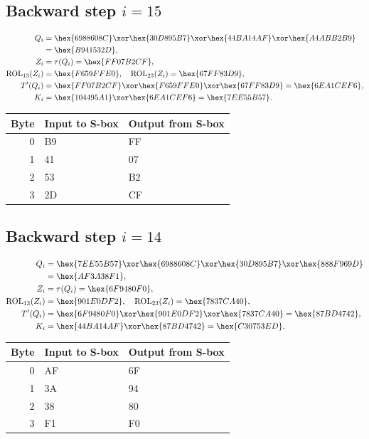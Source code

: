 \subsection*{Backward step $i=15$}
\begin{align*}
Q_i&=\hex{6988608C}\xor\hex{30D895B7}\xor\hex{44BA14AF}\xor\hex{A4ABB2B9}\\&=\hex{B941532D},\\
Z_i&=\tau(Q_i)=\hex{FF07B2CF},\\
\operatorname{ROL}_{13}(Z_i)&=\hex{F659FFE0},\quad\operatorname{ROL}_{23}(Z_i)=\hex{67FF83D9},\\
T'(Q_i)&=\hex{FF07B2CF}\xor\hex{F659FFE0}\xor\hex{67FF83D9}=\hex{6EA1CEF6},\\
K_i&=\hex{104495A1}\xor\hex{6EA1CEF6}=\hex{7EE55B57}.\end{align*}
\begingroup\small
\begin{longtable}{rll}
\toprule
Byte & Input to S-box & Output from S-box\\\midrule
\endhead
0 & B9 & FF\\
1 & 41 & 07\\
2 & 53 & B2\\
3 & 2D & CF\\
\bottomrule\end{longtable}
\endgroup
\subsection*{Backward step $i=14$}
\begin{align*}
Q_i&=\hex{7EE55B57}\xor\hex{6988608C}\xor\hex{30D895B7}\xor\hex{888F969D}\\&=\hex{AF3A38F1},\\
Z_i&=\tau(Q_i)=\hex{6F9480F0},\\
\operatorname{ROL}_{13}(Z_i)&=\hex{901E0DF2},\quad\operatorname{ROL}_{23}(Z_i)=\hex{7837CA40},\\
T'(Q_i)&=\hex{6F9480F0}\xor\hex{901E0DF2}\xor\hex{7837CA40}=\hex{87BD4742},\\
K_i&=\hex{44BA14AF}\xor\hex{87BD4742}=\hex{C30753ED}.\end{align*}
\begingroup\small
\begin{longtable}{rll}
\toprule
Byte & Input to S-box & Output from S-box\\\midrule
\endhead
0 & AF & 6F\\
1 & 3A & 94\\
2 & 38 & 80\\
3 & F1 & F0\\
\bottomrule\end{longtable}
\endgroup
